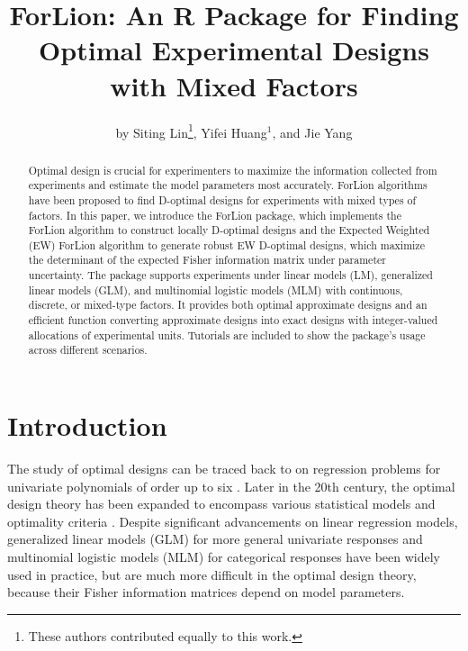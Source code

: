 \title{ForLion: An R Package for Finding Optimal Experimental Designs with Mixed Factors}
\author{by Siting Lin\footnote{These authors contributed equally to this work.}, Yifei Huang$^1$, and Jie Yang}

\maketitle

\begin{abstract}
Optimal design is crucial for experimenters to maximize the information collected from experiments and estimate the model parameters most accurately. ForLion algorithms have been proposed to find D-optimal designs for experiments with mixed types of factors. In this paper, we introduce the ForLion package, which implements the ForLion algorithm to construct locally D-optimal designs and the Expected Weighted (EW) ForLion algorithm to generate robust EW D-optimal designs, which maximize the determinant of the expected Fisher information matrix under parameter uncertainty. The package supports experiments under linear models (LM), generalized linear models (GLM), and multinomial logistic models (MLM) with continuous, discrete, or mixed-type factors. It provides both optimal approximate designs and an efficient function converting approximate designs into exact designs with integer-valued allocations of experimental units. Tutorials are included to show the package's usage across different scenarios.
\end{abstract}

\section{Introduction}\label{sec:introduction}

The study of optimal designs can be traced back to \cite{smith1918standard} on regression problems for univariate polynomials of order up to six \citep{fedorov2014}. Later in the 20th century, the optimal design theory has been expanded to encompass various statistical models and optimality criteria \citep{fedorov1972, silvey1980, pukelsheim1993, atkinson2007, fedorov2014}. 
Despite significant advancements on linear regression models, generalized linear models (GLM) for more general univariate responses \citep{pmcc1989, dobson2018, khuri2006, stufken2012} and multinomial logistic models (MLM) for categorical responses \citep{pmcc1995, atkinson1999, bu2020} have been widely used in practice, but are much more difficult in the optimal design theory, because their Fisher information matrices depend on model parameters.

